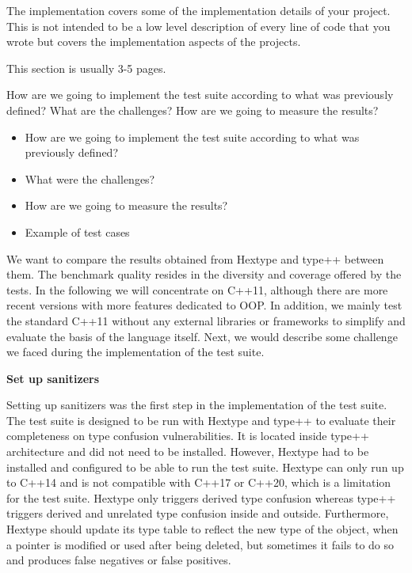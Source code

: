 \documentclass[a4paper,11pt,oneside]{report}
\begin{document}
The implementation covers some of the implementation details of your project.
This is not intended to be a low level description of every line of code that
you wrote but covers the implementation aspects of the projects.

This section is usually 3-5 pages.

How are we going to implement the test suite according to what was previously defined? What are the challenges? 
How are we going to measure the results?

\begin{itemize}
       \item How are we going to implement the test suite according to what was previously defined? 
       \item What were the challenges?
       \item How are we going to measure the results?
       \item Example of test cases
\end{itemize}

We want to compare the results obtained from Hextype and type++ 
between them. The benchmark quality resides in the diversity and coverage
offered by the tests. In the following we will concentrate on C++11,
although there are more recent versions with more features dedicated to OOP. In
addition, we mainly test the standard C++11 without any external libraries or
frameworks to simplify and evaluate the basis of the language itself. 
Next, we would describe some challenge we faced during the implementation of the test suite.

\textbf{Set up sanitizers}

\noindent{}Setting up sanitizers was the first step in the implementation of the
test suite.  The test suite is designed to be run with Hextype and type++ to
evaluate their completeness on type confusion vulnerabilities.  It is located
inside type++ architecture and did not need to be installed. However, Hextype
had to be installed and configured to be able to run the test suite. Hextype can
only run up to C++14 and is not compatible with C++17 or C++20, which is a
limitation for the test suite. Hextype only triggers derived type confusion
whereas type++ triggers derived and unrelated type confusion inside and outside.
Furthermore, Hextype should update its type table to reflect the new type of the object, 
when a pointer is modified or used after being deleted, but sometimes it fails to do
so and produces false negatives or false positives. 
\end{document}

